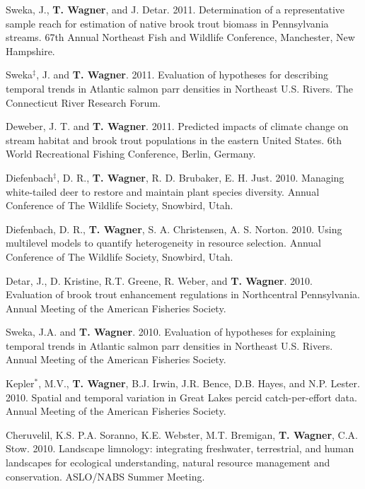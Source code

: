 \documentclass[10pt]{article}
\begin{document}
\begin{flushleft}
\begin{etaremune}
\item Sweka, J.,  {\bf T. Wagner}, and J. Detar. 2011. Determination of a representative sample reach for estimation of native brook trout biomass in Pennsylvania streams. 67th Annual Northeast Fish and Wildlife Conference, Manchester, New Hampshire.

\item Sweka$^\ddagger$, J. and  {\bf T. Wagner}. 2011. Evaluation of hypotheses for describing temporal trends in Atlantic salmon parr densities in Northeast U.S. Rivers. The Connecticut River Research Forum.

\item Deweber, J. T. and {\bf T. Wagner}. 2011. Predicted impacts of climate change on stream habitat and brook trout populations in the eastern United States. 6th World Recreational Fishing Conference, Berlin, Germany.


\item Diefenbach$^\ddagger$, D. R., {\bf T. Wagner}, R. D. Brubaker, E. H. Just. 2010. Managing white-tailed deer to restore and maintain plant species diversity. Annual Conference of The Wildlife Society, Snowbird, Utah. 

\item Diefenbach, D. R.,  {\bf T. Wagner}, S. A. Christensen, A. S. Norton. 2010. Using multilevel models to quantify heterogeneity in resource selection. Annual Conference of The Wildlife Society, Snowbird, Utah.

\item Detar, J., D. Kristine, R.T. Greene, R. Weber, and  {\bf T. Wagner}. 2010. Evaluation of brook trout enhancement regulations in Northcentral Pennsylvania. Annual Meeting of the American Fisheries Society. 

\item Sweka, J.A. and  {\bf T. Wagner}. 2010. Evaluation of hypotheses for explaining temporal trends in Atlantic salmon parr densities in Northeast U.S. Rivers. Annual Meeting of the American Fisheries Society.

\item Kepler$^*$, M.V.,  {\bf T. Wagner}, B.J. Irwin, J.R. Bence, D.B. Hayes, and N.P. Lester. 2010. Spatial and temporal variation in Great Lakes percid catch-per-effort data. Annual Meeting of the American Fisheries Society. 

\item Cheruvelil, K.S. P.A. Soranno, K.E. Webster, M.T. Bremigan, {\bf T. Wagner}, C.A. Stow. 2010. Landscape limnology: integrating freshwater, terrestrial, and human landscapes for ecological understanding, natural resource management and conservation. ASLO/NABS Summer Meeting.


\end{etaremune}
\end{flushleft}
\end{document}
